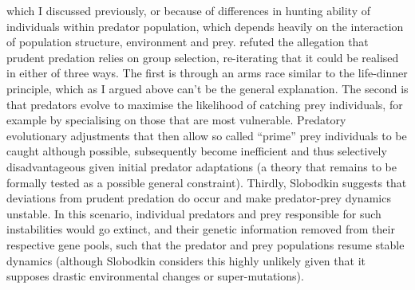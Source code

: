 \documentclass[a4paper]{report}
\begin{document}
\citep{HuffakerC.} which I discussed previously, or because of differences in hunting ability of individuals within predator population, which depends heavily on the interaction of population structure, environment and prey. \citep{slobodkin1974} refuted the allegation that prudent predation relies on group selection, re-iterating that it could be realised in either of three ways. The first is through an arms race similar to the life-dinner principle, which as I argued above can’t be the general explanation. The second is that predators evolve to maximise the likelihood of catching prey individuals, for example by specialising on those that are most vulnerable. Predatory evolutionary adjustments that then allow so called “prime” prey individuals to be caught although possible, subsequently become inefficient and thus selectively disadvantageous given initial predator adaptations (a theory that remains to be formally tested as a possible general constraint). Thirdly, Slobodkin suggests that deviations from prudent predation do occur and make predator-prey dynamics unstable. In this scenario, individual predators and prey responsible for such instabilities would go extinct, and their genetic information removed from their respective gene pools, such that the predator and prey populations resume stable dynamics (although Slobodkin considers this highly unlikely given that it supposes drastic environmental changes or super-mutations). \\
\end{document}
